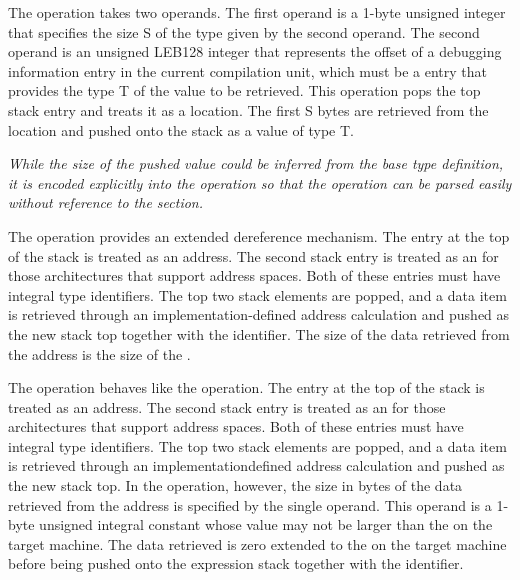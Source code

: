 \begin{enumerate}[1. ]
\itembfnl{\DWOPdereftypeTARG}

The \DWOPdereftypeNAME{} operation takes two operands. The first
operand is a 1-byte unsigned integer that specifies the size S of the
type given by the second operand. The second operand is an unsigned
LEB128 integer that represents the offset of a debugging information
entry in the current compilation unit, which must be a
\DWTAGbasetype{} entry that provides the type T of the value to be
retrieved. This operation pops the top stack entry and treats it as a
location. The first S bytes are retrieved from the location and pushed
onto the stack as a value of type T.

\textit{While the size of the pushed value could be inferred from the
base type definition, it is encoded explicitly into the operation so
that the operation can be parsed easily without reference to the
\dotdebuginfo{} section.}

\itembfnl{\DWOPxderefTARG}
The \DWOPxderefNAME{} operation provides an extended dereference
mechanism. The entry at the top of the stack is treated as an
address. The second stack entry is treated as an  for those architectures that support
address spaces.
Both of these entries must have integral type identifiers.
The top two stack elements are popped,
and a data item is retrieved through an implementation-defined
address calculation and pushed as the new stack top together with the
\generictype{} identifier.
The size of the data retrieved from the
address is the size of the \generictype.

\itembfnl{\DWOPxderefsizeTARG}
The \DWOPxderefsizeNAME{} operation behaves like the
\DWOPxderef{} operation. The entry at the top of the stack is
treated as an address. The second stack entry is treated as
an  for those architectures
that support
address spaces.
Both of these entries must have integral type identifiers.
The top two stack
elements are popped, and a data item is retrieved through an
implementation\dash defined address calculation and pushed as the
new stack top. In the \DWOPxderefsizeNAME{} operation, however,
the size in bytes of the data retrieved from the
address is specified by the single operand. This operand is a
1-byte unsigned integral constant whose value may not be larger
than the  on the target machine. The data
retrieved is zero extended to the  on the
target machine before being pushed onto the expression stack together
with the \generictype{} identifier.


\end{enumerate}
